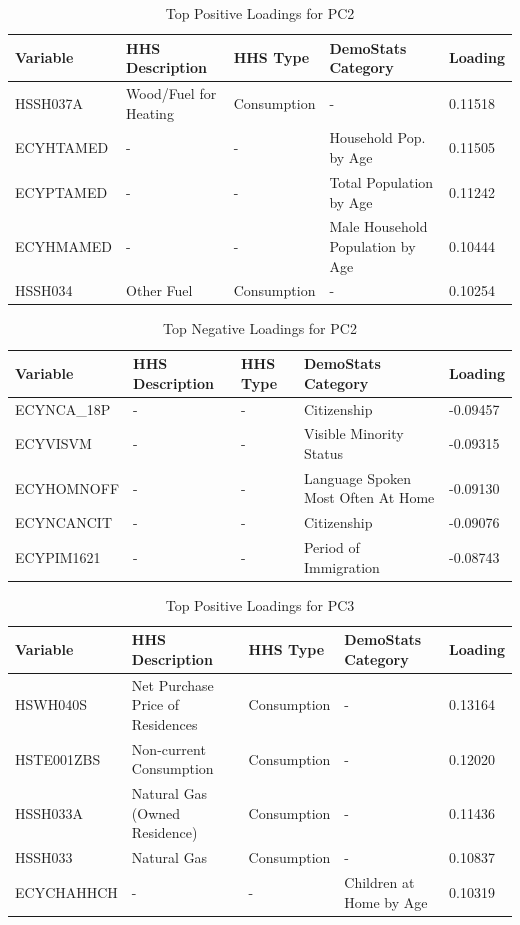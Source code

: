 \documentclass{article}
\begin{document}
\begin{table}[H]
\centering
\caption{Top Positive Loadings for PC2}
\label{tab:pc2_pos}
\begin{tabular}{@{}lllll@{}}
\toprule
Variable & HHS Description & HHS Type & DemoStats Category & Loading \\
\midrule
HSSH037A & Wood/Fuel for Heating & Consumption & - & 0.11518 \\
ECYHTAMED & - & - & Household Pop. by Age & 0.11505 \\
ECYPTAMED & - & - & Total Population by Age & 0.11242 \\
ECYHMAMED & - & - & Male Household Population by Age & 0.10444 \\
HSSH034 & Other Fuel & Consumption & - & 0.10254 \\
\bottomrule
\end{tabular}
\end{table}

\begin{table}[H]
\centering
\caption{Top Negative Loadings for PC2}
\label{tab:pc2_neg}
\begin{tabular}{@{}lllll@{}}
\toprule
Variable & HHS Description & HHS Type & DemoStats Category & Loading \\
\midrule
ECYNCA\_18P & - & - & Citizenship & -0.09457 \\
ECYVISVM & - & - & Visible Minority Status & -0.09315 \\
ECYHOMNOFF & - & - & Language Spoken Most Often At Home & -0.09130 \\
ECYNCANCIT & - & - & Citizenship & -0.09076 \\
ECYPIM1621 & - & - & Period of Immigration & -0.08743 \\
\bottomrule
\end{tabular}
\end{table}

\begin{table}[H]
\centering
\caption{Top Positive Loadings for PC3}
\label{tab:pc3_pos}
\begin{tabular}{@{}lllll@{}}
\toprule
Variable & HHS Description & HHS Type & DemoStats Category & Loading \\
\midrule
HSWH040S & Net Purchase Price of Residences & Consumption & - & 0.13164 \\
HSTE001ZBS & Non-current Consumption & Consumption & - & 0.12020 \\
HSSH033A & Natural Gas (Owned Residence) & Consumption & - & 0.11436 \\
HSSH033 & Natural Gas & Consumption & - & 0.10837 \\
ECYCHAHHCH & - & - & Children at Home by Age & 0.10319 \\
\bottomrule
\end{tabular}
\end{table}
\end{document}
